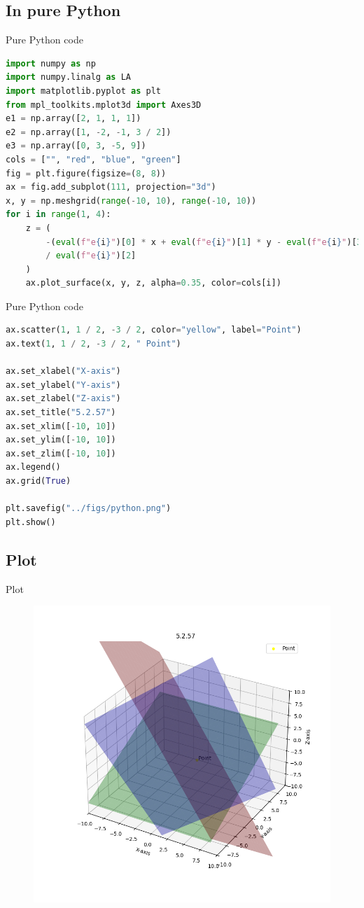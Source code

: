 \documentclass{beamer}
\theoremstyle{remark}
\numberwithin{equation}{section}
\begin{document}
\subsection{In pure Python}
\begin{frame}[fragile]{Pure Python code}
 \begin{lstlisting}[language=Python]
import numpy as np
import numpy.linalg as LA
import matplotlib.pyplot as plt
from mpl_toolkits.mplot3d import Axes3D
e1 = np.array([2, 1, 1, 1])
e2 = np.array([1, -2, -1, 3 / 2])
e3 = np.array([0, 3, -5, 9])
cols = ["", "red", "blue", "green"]
fig = plt.figure(figsize=(8, 8))
ax = fig.add_subplot(111, projection="3d")
x, y = np.meshgrid(range(-10, 10), range(-10, 10))
for i in range(1, 4):
    z = (
        -(eval(f"e{i}")[0] * x + eval(f"e{i}")[1] * y - eval(f"e{i}")[3])
        / eval(f"e{i}")[2]
    )
    ax.plot_surface(x, y, z, alpha=0.35, color=cols[i])
 \end{lstlisting}
\end{frame}
\begin{frame}[fragile]{Pure Python code}
 \begin{lstlisting}[language=Python]
ax.scatter(1, 1 / 2, -3 / 2, color="yellow", label="Point")
ax.text(1, 1 / 2, -3 / 2, " Point")

ax.set_xlabel("X-axis")
ax.set_ylabel("Y-axis")
ax.set_zlabel("Z-axis")
ax.set_title("5.2.57")
ax.set_xlim([-10, 10])
ax.set_ylim([-10, 10])
ax.set_zlim([-10, 10])
ax.legend()
ax.grid(True)

plt.savefig("../figs/python.png")
plt.show()
 \end{lstlisting}
\end{frame}
\subsection{Plot}
\begin{frame}{Plot}
 \begin{figure}[H]
    \centering
    \includegraphics[width=0.75\columnwidth]{../figs/python.png}
    \caption*{}
    \label{fig:plot}
\end{figure}
\end{frame}
\end{document}
